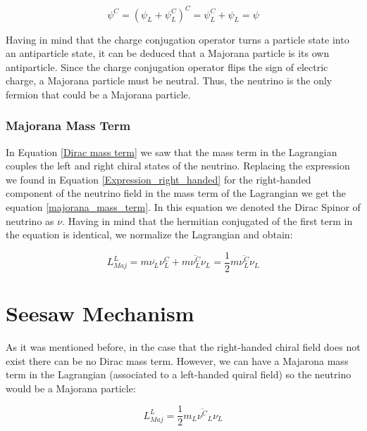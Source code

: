\begin{equation}
\psi^C = (\psi_L + \psi^C_L)^C = \psi^C_L + \psi_L = \psi
\end{equation}

Having in mind that the charge conjugation operator turns a particle state into an antiparticle state, it can be deduced that a Majorana particle is its own antiparticle.
Since the charge conjugation operator flips the sign of electric charge, a Majorana particle must be neutral. Thus, the neutrino is the only fermion that could be a Majorana particle.

\subsubsection{Majorana Mass Term}

In Equation \ref{Dirac mass term} we saw that the mass term in the Lagrangian couples the left and right chiral states of the neutrino. Replacing the 
expression we found in Equation \ref{Expression_right_handed} for the right-handed component of the neutrino field in the mass term of the Lagrangian we get the equation \ref{majorana_mass_term}. In this equation we denoted the Dirac Spinor of neutrino as $\nu$. Having in mind that the hermitian conjugated of the first term in the equation is identical, we normalize the Lagrangian and obtain:


\begin{equation}\label{majorana_mass_term}
L_{Maj}^{L} = m \overline{\nu_L} \nu_L^C + m \overline{\nu_L^C} \nu_L = \frac{1}{2} m \overline{\nu_L^{C}} \nu_L
\end{equation}




\section{Seesaw Mechanism}

As it was mentioned before, in the case that the right-handed chiral field does not exist there can be no Dirac mass term. However, we can have a Majarona mass term in the 
Lagrangian (associated to a left-handed quiral field) so the neutrino would be a Majorana particle:

\begin{equation}
L_{Maj}^{L} = \frac{1}{2} m_L \overline{\nu^{C}}_L \nu_L
\end{equation}

